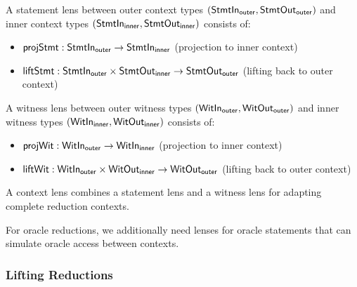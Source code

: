 \begin{definition}
    \label{def:statement_lens}
    A statement lens between outer context types $(\mathsf{StmtIn}_{\mathsf{outer}}, \mathsf{StmtOut}_{\mathsf{outer}})$ and inner context types $(\mathsf{StmtIn}_{\mathsf{inner}}, \mathsf{StmtOut}_{\mathsf{inner}})$ consists of:
    \begin{itemize}
        \item $\mathsf{projStmt} : \mathsf{StmtIn}_{\mathsf{outer}} \to \mathsf{StmtIn}_{\mathsf{inner}}$ (projection to inner context)
        \item $\mathsf{liftStmt} : \mathsf{StmtIn}_{\mathsf{outer}} \times \mathsf{StmtOut}_{\mathsf{inner}} \to \mathsf{StmtOut}_{\mathsf{outer}}$ (lifting back to outer context)
    \end{itemize}
\end{definition}

\begin{definition}
    \label{def:witness_lens}
    A witness lens between outer witness types $(\mathsf{WitIn}_{\mathsf{outer}}, \mathsf{WitOut}_{\mathsf{outer}})$ and inner witness types $(\mathsf{WitIn}_{\mathsf{inner}}, \mathsf{WitOut}_{\mathsf{inner}})$ consists of:
    \begin{itemize}
        \item $\mathsf{projWit} : \mathsf{WitIn}_{\mathsf{outer}} \to \mathsf{WitIn}_{\mathsf{inner}}$ (projection to inner context)
        \item $\mathsf{liftWit} : \mathsf{WitIn}_{\mathsf{outer}} \times \mathsf{WitOut}_{\mathsf{inner}} \to \mathsf{WitOut}_{\mathsf{outer}}$ (lifting back to outer context)
    \end{itemize}
\end{definition}

\begin{definition}
    \label{def:context_lens}
    A context lens combines a statement lens and a witness lens for adapting complete reduction contexts.
\end{definition}

\begin{definition}
    \label{def:oracle_context_lens}
    For oracle reductions, we additionally need lenses for oracle statements that can simulate oracle access between contexts.
\end{definition}

\subsubsection{Lifting Reductions}

